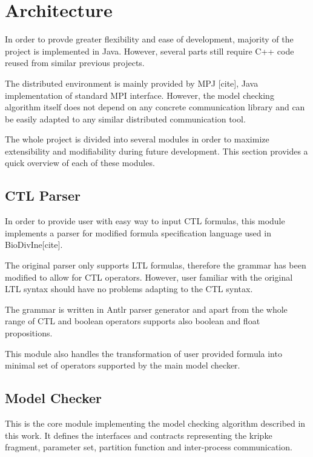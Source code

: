 \documentclass[12pt,oneside,draft]{fithesis2}
\begin{document}
		\section{Architecture}
		
			In order to provde greater flexibility and ease of development, majority of the project is implemented in Java. However, several parts still require C++ code reused from similar previous projects. 
			
			The distributed environment is mainly provided by MPJ [cite], Java implementation of standard MPI interface. However, the model checking algorithm itself does not depend on any concrete communication library and can be easily adapted to any similar distributed communication tool.
			
			The whole project is divided into several modules in order to maximize extensibility and modifiability during future development. This section provides a quick overview of each of these modules.
			
			\subsection{CTL Parser}
			
				In order to provide user with easy way to input CTL formulas, this module implements a parser for modified formula specification language used in BioDivIne[cite]. 
				
				The original parser only supports LTL formulas, therefore the grammar has been modified to allow for CTL operators. However, user familiar with the original LTL syntax should have no problems adapting to the CTL syntax.
				
				The grammar is written in Antlr parser generator and apart from the whole range of CTL and boolean operators supports also boolean and float propositions.
				
				This module also handles the transformation of user provided formula into minimal set of operators supported by the main model checker.
				
			\subsection{Model Checker}
			
				This is the core module implementing the model checking algorithm described in this work. It defines the interfaces and contracts representing the kripke fragment, parameter set, partition function and inter-process communication.
				
\end{document}
